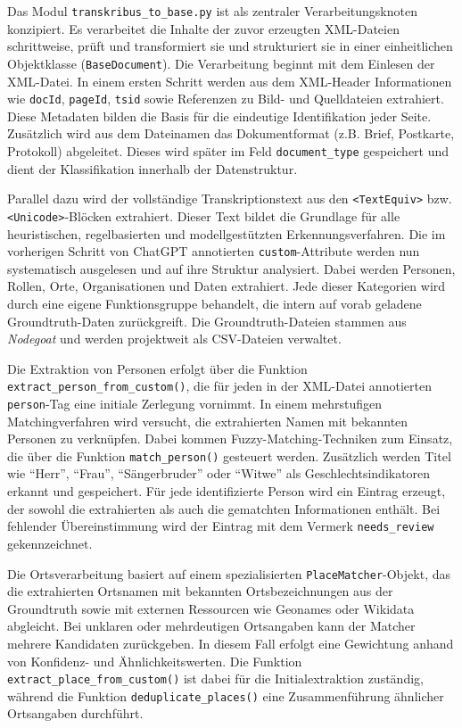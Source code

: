 \documentclass[12pt, a4paper, ngerman, bidi=default]{article}
\newcommand{\code}[1]{\colorbox{VeryLightGray}{\texttt{#1}}} %
\begin{document}
Das Modul \code{transkribus\_to\_base.py} ist als zentraler Verarbeitungsknoten konzipiert. Es verarbeitet die Inhalte 
der zuvor erzeugten XML-Dateien schrittweise, prüft und transformiert sie und strukturiert sie in einer einheitlichen Objektklasse 
(\code{BaseDocument}). Die Verarbeitung beginnt mit dem Einlesen der XML-Datei. In einem ersten Schritt werden aus dem XML-Header 
Informationen wie \code{docId}, \code{pageId}, \code{tsid} sowie Referenzen zu Bild- und Quelldateien extrahiert. Diese Metadaten 
bilden die Basis für die eindeutige Identifikation jeder Seite. Zusätzlich wird aus dem Dateinamen das Dokumentformat (z.B. Brief, 
Postkarte, Protokoll) abgeleitet. Dieses wird später im Feld \code{document\_type} gespeichert und dient der Klassifikation innerhalb 
der Datenstruktur.

Parallel dazu wird der vollständige Transkriptionstext aus den \code{<TextEquiv>} bzw. \code{<Unicode>}-Blöcken extrahiert. Dieser 
Text bildet die Grundlage für alle heuristischen, regelbasierten und modellgestützten Erkennungsverfahren. Die im vorherigen Schritt von 
ChatGPT annotierten \code{custom}-Attribute werden nun systematisch ausgelesen und auf ihre Struktur analysiert. Dabei werden Personen, 
Rollen, Orte, Organisationen und Daten extrahiert. Jede dieser Kategorien wird durch eine eigene Funktionsgruppe behandelt, die intern auf 
vorab geladene Groundtruth-Daten zurückgreift. Die Groundtruth-Dateien stammen aus \textit{Nodegoat} und werden projektweit als 
CSV-Dateien verwaltet.

Die Extraktion von Personen erfolgt über die Funktion \code{extract\_person\_from\_custom()}, die für jeden in der XML-Datei 
annotierten \code{person}-Tag eine initiale Zerlegung vornimmt. In einem mehrstufigen Matchingverfahren wird versucht, die 
extrahierten Namen mit bekannten Personen zu verknüpfen. Dabei kommen Fuzzy-Matching-Techniken zum Einsatz, die über die Funktion 
\code{match\_person()} gesteuert werden. Zusätzlich werden Titel wie \enquote{Herr}, \enquote{Frau}, \enquote{Sängerbruder} oder 
\enquote{Witwe} als Geschlechtsindikatoren erkannt und gespeichert. Für jede identifizierte Person wird ein Eintrag erzeugt, der sowohl 
die extrahierten als auch die gematchten Informationen enthält. Bei fehlender Übereinstimmung wird der Eintrag mit dem Vermerk 
\code{needs\_review} gekennzeichnet.

Die Ortsverarbeitung basiert auf einem spezialisierten \code{PlaceMatcher}-Objekt, das die extrahierten Ortsnamen mit bekannten 
Ortsbezeichnungen aus der Groundtruth sowie mit externen Ressourcen wie Geonames oder Wikidata abgleicht. Bei unklaren oder 
mehrdeutigen Ortsangaben kann der Matcher mehrere Kandidaten zurückgeben. In diesem Fall erfolgt eine Gewichtung anhand von 
Konfidenz- und Ähnlichkeitswerten. Die Funktion \code{extract\_place\_from\_custom()} ist dabei für die Initialextraktion 
zuständig, während die Funktion \code{deduplicate\_places()} eine Zusammenführung ähnlicher Ortsangaben durchführt.
\end{document}
